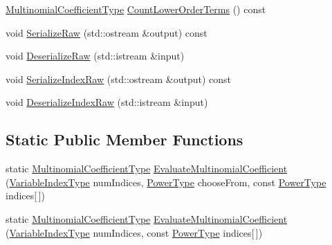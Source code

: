 \begin{DoxyCompactItemize}
\item 
\hyperlink{classnmr_polynomial_term_power_index_a09f482da776cfb829e26ad1fb381ab94}{Multinomial\+Coefficient\+Type} \hyperlink{classnmr_polynomial_term_power_index_a00c963b24985cd807343d187d6eb06c1}{Count\+Lower\+Order\+Terms} () const 
\item 
void \hyperlink{classnmr_polynomial_term_power_index_a5030f6067b58ac04f22153df1361e5db}{Serialize\+Raw} (std\+::ostream \&output) const 
\item 
void \hyperlink{classnmr_polynomial_term_power_index_a613c587165babcaf39d0b1258d57a226}{Deserialize\+Raw} (std\+::istream \&input)
\item 
void \hyperlink{classnmr_polynomial_term_power_index_ad70d8491c72c723c52d6ee09d54755b8}{Serialize\+Index\+Raw} (std\+::ostream \&output) const 
\item 
void \hyperlink{classnmr_polynomial_term_power_index_ae80206421efe7d48c9b7a63c3e29c477}{Deserialize\+Index\+Raw} (std\+::istream \&input)
\end{DoxyCompactItemize}
\subsection*{Static Public Member Functions}
\begin{DoxyCompactItemize}
\item 
static \hyperlink{classnmr_polynomial_term_power_index_a09f482da776cfb829e26ad1fb381ab94}{Multinomial\+Coefficient\+Type} \hyperlink{classnmr_polynomial_term_power_index_a827051ab88ffb5305c6090ace6988a4f}{Evaluate\+Multinomial\+Coefficient} (\hyperlink{classnmr_polynomial_term_power_index_ac982d5f82c3a95968e92d54c92cbc3e0}{Variable\+Index\+Type} num\+Indices, \hyperlink{classnmr_polynomial_term_power_index_a2eec01c3a2c3f56f47982ceffd8e36ed}{Power\+Type} choose\+From, const \hyperlink{classnmr_polynomial_term_power_index_a2eec01c3a2c3f56f47982ceffd8e36ed}{Power\+Type} indices\mbox{[}$\,$\mbox{]})
\item 
static \hyperlink{classnmr_polynomial_term_power_index_a09f482da776cfb829e26ad1fb381ab94}{Multinomial\+Coefficient\+Type} \hyperlink{classnmr_polynomial_term_power_index_af9e1b36b14be507248d9c47571508c20}{Evaluate\+Multinomial\+Coefficient} (\hyperlink{classnmr_polynomial_term_power_index_ac982d5f82c3a95968e92d54c92cbc3e0}{Variable\+Index\+Type} num\+Indices, const \hyperlink{classnmr_polynomial_term_power_index_a2eec01c3a2c3f56f47982ceffd8e36ed}{Power\+Type} indices\mbox{[}$\,$\mbox{]})
\end{DoxyCompactItemize}
